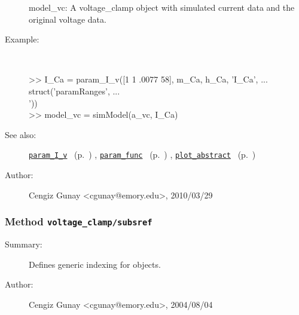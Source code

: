 \begin{description}
   model\_vc: A voltage\_clamp object with simulated current data and
   	      the original voltage data.
%
\item[Example:]~
\begin{lyxcode} >> I\_Ca = param\_I\_v([1 1 .0077 58], m\_Ca, h\_Ca, 'I\_{Ca}', ...
\\%
              struct('paramRanges', ...
\\%
                     [1 4; 0 1; 0 1e3; 100 200]'))
\\%
 >> model\_vc = simModel(a\_vc, I\_Ca)
\\%
\end{lyxcode}
%
\item[See also:]%
\hyperlink{ref_param_I_v}{\texttt{param\_I\_v}}%
\ (p.~\pageref{ref_param_I_v})%
%
, \hyperlink{ref_param_func}{\texttt{param\_func}}%
\ (p.~\pageref{ref_param_func})%
%
, \hyperlink{ref_plot_abstract}{\texttt{plot\_abstract}}%
\ (p.~\pageref{ref_plot_abstract})%
%
%
\item[Author:]%
Cengiz Gunay <cgunay@emory.edu>, 2010/03/29
%
\end{description}
\methodline%
\subsubsection[Method \texttt{subsref}]{Method \texttt{voltage\_clamp/subsref}}%
%
\label{ref_voltage_clamp__subsref}%
\hypertarget{ref_voltage_clamp__subsref}{}%
\begin{description}
\item[Summary:]Defines generic indexing for objects.
%
%
%
%
%
%
%
\item[Author:]%
Cengiz Gunay <cgunay@emory.edu>, 2004/08/04
%
\end{description}
\methodline%
